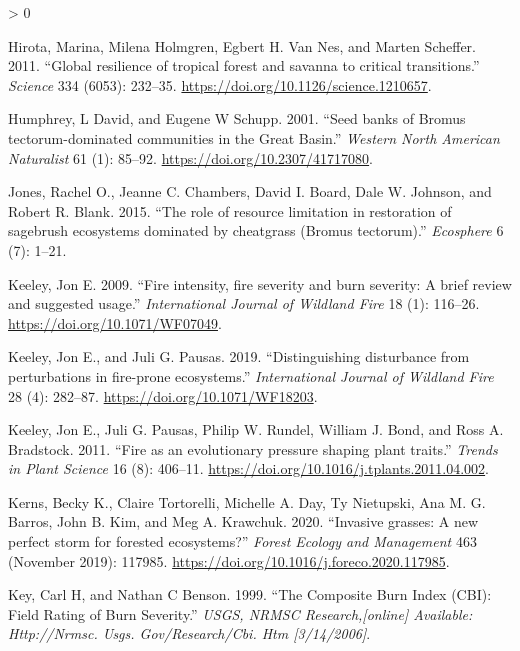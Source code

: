 \documentclass[
  12pt,
]{article}
\newlength{\cslhangindent}
\newenvironment{CSLReferences}[2] %
 {%
  \setlength{\parindent}{0pt}
  \ifodd #1 \everypar{\setlength{\hangindent}{\cslhangindent}}\ignorespaces\fi
  \ifnum #2 > 0
  \setlength{\parskip}{#2\baselineskip}
  \fi
 }%
 {}
\begin{document}
\begin{CSLReferences}{1}{0}
\leavevmode\hypertarget{ref-Hirota2011}{}%
Hirota, Marina, Milena Holmgren, Egbert H. Van Nes, and Marten Scheffer.
2011. {``{Global resilience of tropical forest and savanna to critical
transitions}.''} \emph{Science} 334 (6053): 232--35.
\url{https://doi.org/10.1126/science.1210657}.

\leavevmode\hypertarget{ref-Humphrey2001}{}%
Humphrey, L David, and Eugene W Schupp. 2001. {``{Seed banks of Bromus
tectorum-dominated communities in the Great Basin}.''} \emph{Western
North American Naturalist} 61 (1): 85--92.
\url{https://doi.org/10.2307/41717080}.

\leavevmode\hypertarget{ref-Jones2015}{}%
Jones, Rachel O., Jeanne C. Chambers, David I. Board, Dale W. Johnson,
and Robert R. Blank. 2015. {``{The role of resource limitation in
restoration of sagebrush ecosystems dominated by cheatgrass (Bromus
tectorum)}.''} \emph{Ecosphere} 6 (7): 1--21.

\leavevmode\hypertarget{ref-Keeley2009}{}%
Keeley, Jon E. 2009. {``{Fire intensity, fire severity and burn
severity: A brief review and suggested usage}.''} \emph{International
Journal of Wildland Fire} 18 (1): 116--26.
\url{https://doi.org/10.1071/WF07049}.

\leavevmode\hypertarget{ref-Keeley2019}{}%
Keeley, Jon E., and Juli G. Pausas. 2019. {``{Distinguishing disturbance
from perturbations in fire-prone ecosystems}.''} \emph{International
Journal of Wildland Fire} 28 (4): 282--87.
\url{https://doi.org/10.1071/WF18203}.

\leavevmode\hypertarget{ref-Keeley2011}{}%
Keeley, Jon E., Juli G. Pausas, Philip W. Rundel, William J. Bond, and
Ross A. Bradstock. 2011. {``{Fire as an evolutionary pressure shaping
plant traits}.''} \emph{Trends in Plant Science} 16 (8): 406--11.
\url{https://doi.org/10.1016/j.tplants.2011.04.002}.

\leavevmode\hypertarget{ref-Kerns2020}{}%
Kerns, Becky K., Claire Tortorelli, Michelle A. Day, Ty Nietupski, Ana
M. G. Barros, John B. Kim, and Meg A. Krawchuk. 2020. {``{Invasive
grasses: A new perfect storm for forested ecosystems?}''} \emph{Forest
Ecology and Management} 463 (November 2019): 117985.
\url{https://doi.org/10.1016/j.foreco.2020.117985}.

\leavevmode\hypertarget{ref-Key1999}{}%
Key, Carl H, and Nathan C Benson. 1999. {``The Composite Burn Index
(CBI): Field Rating of Burn Severity.''} \emph{USGS, NRMSC
Research,{[}online{]} Available: Http://Nrmsc. Usgs. Gov/Research/Cbi.
Htm {[}3/14/2006{]}}.


\end{CSLReferences}
\end{document}
